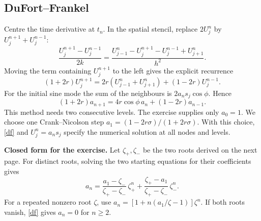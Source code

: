 \documentclass[11pt,a4paper]{article}
\numberwithin{equation}{section}
\begin{document}
\subsection{DuFort--Frankel}
Centre the time derivative at \(t_n\). In the spatial stencil, replace \(2U_j^n\) by \(U_j^{n+1}+U_j^{n-1}\):
\[
 \frac{U_j^{n+1}-U_j^{n-1}}{2k}
 =\frac{U_{j-1}^n-U_j^{n+1}-U_j^{n-1}+U_{j+1}^n}{h^2}.
\]
Moving the term containing \(U_j^{n+1}\) to the left gives the explicit recurrence
\[
 (1+2r)U_j^{n+1}=2r(U_{j-1}^n+U_{j+1}^n)+(1-2r)U_j^{n-1}.
\]
For the initial sine mode the sum of the neighbours is \(2a_n s_j\cos\phi\). Hence
\begin{equation}\label{df}
 (1+2r)a_{n+1}=4r\cos\phi\,a_n+(1-2r)a_{n-1}.
\end{equation}
This method needs two consecutive levels. The exercise supplies only \(a_0=1\). We choose one Crank--Nicolson step \(a_1=(1-2r\sigma)/(1+2r\sigma)\). With this choice, \eqref{df} and \(U_j^n=a_n s_j\) specify the numerical solution at all nodes and levels.

\textbf{Closed form for the exercise.} Let \(\zeta_+,\zeta_-\) be the two roots derived on the next page. For distinct roots, solving the two starting equations for their coefficients gives
\[
 a_n=\frac{a_1-\zeta_-}{\zeta_+-\zeta_-}\,\zeta_+^n
     +\frac{\zeta_+-a_1}{\zeta_+-\zeta_-}\,\zeta_-^n.
\]
For a repeated nonzero root \(\zeta\), use \(a_n=[1+n(a_1/\zeta-1)]\zeta^n\). If both roots vanish, \eqref{df} gives \(a_n=0\) for \(n\ge2\).

\clearpage
\end{document}
